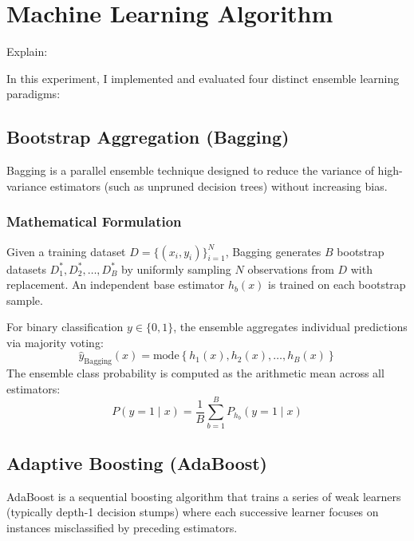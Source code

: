 \documentclass[12pt,a4paper]{article}
\begin{document}
\section{Machine Learning Algorithm}

Explain:

In this experiment, I implemented and evaluated four distinct ensemble learning paradigms:

\subsection{Bootstrap Aggregation (Bagging)}

Bagging is a parallel ensemble technique designed to reduce the variance of high-variance estimators (such as unpruned decision trees) without increasing bias.

\subsubsection*{Mathematical Formulation}
Given a training dataset $D = \{(x_i, y_i)\}_{i=1}^N$, Bagging generates $B$ bootstrap datasets $D_1^*, D_2^*, \dots, D_B^*$ by uniformly sampling $N$ observations from $D$ with replacement. An independent base estimator $h_b(x)$ is trained on each bootstrap sample.

For binary classification $y \in \{0, 1\}$, the ensemble aggregates individual predictions via majority voting:
\begin{equation}
\hat{y}_{\text{Bagging}}(x) = \text{mode} \left\{ h_1(x), h_2(x), \dots, h_B(x) \right\}
\end{equation}
The ensemble class probability is computed as the arithmetic mean across all estimators:
\begin{equation}
P(y = 1 \mid x) = \frac{1}{B} \sum_{b=1}^{B} P_{h_b}(y = 1 \mid x)
\end{equation}

\subsection{Adaptive Boosting (AdaBoost)}

AdaBoost is a sequential boosting algorithm that trains a series of weak learners (typically depth-1 decision stumps) where each successive learner focuses on instances misclassified by preceding estimators.
\end{document}
